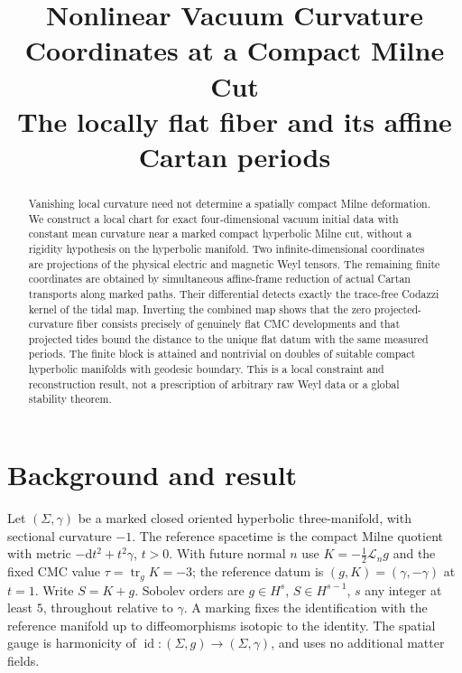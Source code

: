 \documentclass[11pt]{article}
\title{Nonlinear Vacuum Curvature Coordinates at a Compact Milne Cut\\
\large The locally flat fiber and its affine Cartan periods}
\author{}
\date{}
\theoremstyle{remark}
\newcommand{\tr}{\operatorname{tr}}
\newcommand{\id}{\operatorname{id}}
\newcommand{\dd}{\mathrm{d}}
\newcommand{\Lie}{\mathcal L}
\begin{document}
\maketitle
\begin{abstract}
Vanishing local curvature need not determine a spatially compact Milne deformation. We construct a local chart for exact four-dimensional vacuum initial data with constant mean curvature near a marked compact hyperbolic Milne cut, without a rigidity hypothesis on the hyperbolic manifold. Two infinite-dimensional coordinates are projections of the physical electric and magnetic Weyl tensors. The remaining finite coordinates are obtained by simultaneous affine-frame reduction of actual Cartan transports along marked paths. Their differential detects exactly the trace-free Codazzi kernel of the tidal map. Inverting the combined map shows that the zero projected-curvature fiber consists precisely of genuinely flat CMC developments and that projected tides bound the distance to the unique flat datum with the same measured periods. The finite block is attained and nontrivial on doubles of suitable compact hyperbolic manifolds with geodesic boundary. This is a local constraint and reconstruction result, not a prescription of arbitrary raw Weyl data or a global stability theorem.
\end{abstract}

\section{Background and result}\label{sec:intro}

Let \((\Sigma,\gamma)\) be a marked closed oriented hyperbolic three-manifold, with sectional curvature \(-1\). The reference spacetime is the compact Milne quotient with metric \(-\dd t^2+t^2\gamma\), \(t>0\). With future normal \(n\) use \(K=-\tfrac12\Lie_n g\) and the fixed CMC value \(\tau=\tr_g K=-3\); the reference datum is \((g,K)=(\gamma,-\gamma)\) at \(t=1\). Write \(S=K+g\). Sobolev orders are \(g\in H^s\), \(S\in H^{s-1}\), \(s\) any integer at least \(5\), throughout relative to \(\gamma\). A marking fixes the identification with the reference manifold up to diffeomorphisms isotopic to the identity. The spatial gauge is harmonicity of \(\id:(\Sigma,g)\to(\Sigma,\gamma)\), and uses no additional matter fields.
\end{document}
